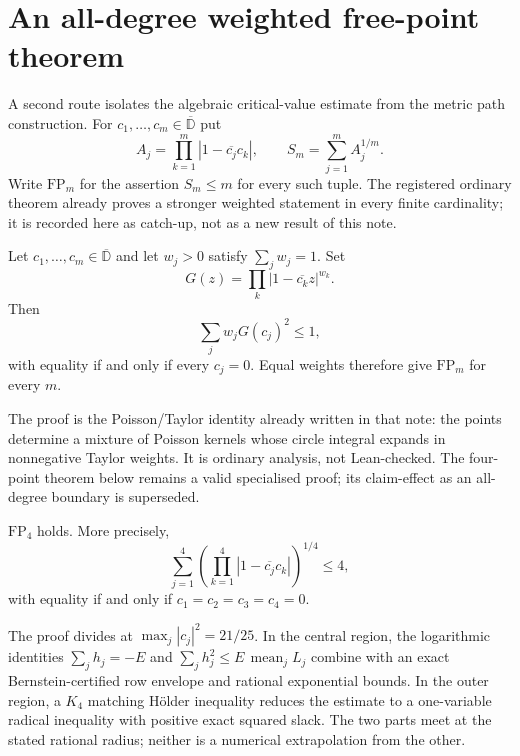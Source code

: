 \section{An all-degree weighted free-point theorem}
\label{sec:freepoint}

A second route isolates the algebraic critical-value estimate from the metric
path construction.  For $c_1,\ldots,c_m\in\overline{\mathbb D}$ put
\[
 A_j=\prod_{k=1}^m |1-\overline{c_j}c_k|,
 \qquad
 S_m=\sum_{j=1}^m A_j^{1/m}.
\]
Write $\mathrm{FP}_m$ for the assertion $S_m\le m$ for every such tuple.
The registered ordinary theorem
already proves a stronger weighted statement in every finite cardinality;
it is recorded here as catch-up, not as a new result of this note.

\begin{theorem}
\label{res:fp-weighted-all-degree}
Let $c_1,\ldots,c_m\in\overline{\mathbb D}$ and let $w_j>0$ satisfy
$\sum_j w_j=1$.  Set
\[
 G(z)=\prod_k |1-\overline{c_k}z|^{w_k}.
\]
Then
\[
 \sum_j w_j G(c_j)^2\le 1,
\]
with equality if and only if every $c_j=0$.  Equal weights therefore give
$\mathrm{FP}_m$ for every $m$.
\end{theorem}

The proof is the Poisson/Taylor identity already written in that note: the
points determine a mixture of Poisson kernels whose circle integral expands
in nonnegative Taylor weights.  It is ordinary analysis, not Lean-checked.
The four-point theorem below remains a valid specialised proof; its
claim-effect as an all-degree boundary is superseded.

\begin{theorem}\label{res:fp4}
$\mathrm{FP}_4$ holds.  More precisely,
\[
 \sum_{j=1}^4
   \left(\prod_{k=1}^4|1-\overline{c_j}c_k|\right)^{1/4}
 \le4,
\]
with equality if and only if $c_1=c_2=c_3=c_4=0$.
\end{theorem}

The proof divides at $\max_j|c_j|^2=21/25$.  In the central region, the
logarithmic identities $\sum_j h_j=-E$ and
$\sum_j h_j^2\le E\,\operatorname{mean}_j L_j$ combine with an exact
Bernstein-certified row envelope and rational exponential bounds.  In the
outer region, a $K_4$ matching H\"older inequality reduces the estimate to a
one-variable radical inequality with positive exact squared slack.  The two
parts meet at the stated rational radius; neither is a numerical extrapolation
from the other.

